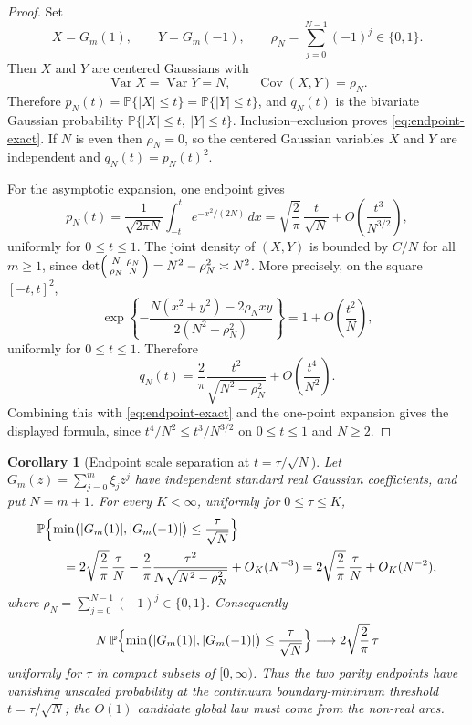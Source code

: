 \documentclass[11pt]{amsart}
\numberwithin{equation}{section}
\newtheorem{corollary}[theorem]{Corollary}
\theoremstyle{definition}
\theoremstyle{remark}
\newcommand{\Prob}{\mathbb P}
\newcommand{\Var}{\operatorname{Var}}
\newcommand{\Cov}{\operatorname{Cov}}
\begin{document}
\begin{proof}
Set
\[
  X=G_m(1),\qquad Y=G_m(-1),\qquad
  \rho_N=\sum_{j=0}^{N-1}(-1)^j\in\{0,1\}.
\]
Then \(X\) and \(Y\) are centered Gaussians with
\[
  \Var X=\Var Y=N,\qquad \Cov(X,Y)=\rho_N .
\]
Therefore \(p_N(t)=\Prob\{|X|\le t\}=\Prob\{|Y|\le t\}\), and \(q_N(t)\) is
the bivariate Gaussian probability
\(\Prob\{|X|\le t,\ |Y|\le t\}\). Inclusion--exclusion proves
\eqref{eq:endpoint-exact}.  If \(N\) is even then \(\rho_N=0\), so the centered
Gaussian variables \(X\) and \(Y\) are independent and \(q_N(t)=p_N(t)^2\).

For the asymptotic expansion, one endpoint gives
\[
  p_N(t)
  =\frac1{\sqrt{2\pi N}}\int_{-t}^{t}e^{-x^2/(2N)}\,dx
  =
  \sqrt{\frac2\pi}\,\frac{t}{\sqrt N}
  +O\!\left(\frac{t^3}{N^{3/2}}\right),
\]
uniformly for \(0\le t\le1\).  The joint density of \((X,Y)\) is bounded by
\(C/N\) for all \(m\ge1\), since
\(\det\begin{psmallmatrix}N&\rho_N\\ \rho_N&N\end{psmallmatrix}
=N^2-\rho_N^2\asymp N^2\).  More precisely, on the square
\([-t,t]^2\),
\[
  \exp\!\left\{
    -\frac{N(x^2+y^2)-2\rho_Nxy}{2(N^2-\rho_N^2)}
  \right\}
  =1+O\!\left(\frac{t^2}{N}\right),
\]
uniformly for \(0\le t\le1\).  Therefore
\[
  q_N(t)
  =\frac{2}{\pi}\frac{t^2}{\sqrt{N^2-\rho_N^2}}
  +O\!\left(\frac{t^4}{N^2}\right).
\]
Combining this with \eqref{eq:endpoint-exact} and the one-point expansion gives
the displayed formula, since \(t^4/N^2\le t^3/N^{3/2}\) on \(0\le t\le1\) and
\(N\ge2\).
\end{proof}

\begin{corollary}[Endpoint scale separation at \(t=\tau/\sqrt N\)]
\label{cor:endpoint-continuum-negligible}
Let \(G_m(z)=\sum_{j=0}^m\xi_jz^j\) have independent standard real Gaussian
coefficients, and put \(N=m+1\).  For every \(K<\infty\), uniformly for
\(0\le \tau\le K\),
\[
  \begin{aligned}
  &\Prob\Bigl\{
      \min\bigl(|G_m(1)|,|G_m(-1)|\bigr)\le \frac{\tau}{\sqrt N}
    \Bigr\}  \\
  &\qquad =
  2\sqrt{\frac2\pi}\,\frac{\tau}{N}
  -\frac{2}{\pi}\frac{\tau^2}{N\sqrt{N^2-\rho_N^2}}
  +O_K(N^{-3})
  =
  2\sqrt{\frac2\pi}\,\frac{\tau}{N}+O_K(N^{-2}),
  \end{aligned}
\]
where \(\rho_N=\sum_{j=0}^{N-1}(-1)^j\in\{0,1\}\).  Consequently
\[
  N\,\Prob\Bigl\{
      \min\bigl(|G_m(1)|,|G_m(-1)|\bigr)\le \frac{\tau}{\sqrt N}
    \Bigr\}
  \longrightarrow 2\sqrt{\frac2\pi}\,\tau
\]
uniformly for \(\tau\) in compact subsets of \([0,\infty)\).  Thus the two
parity endpoints have vanishing unscaled probability at the continuum
boundary-minimum threshold \(t=\tau/\sqrt N\); the \(O(1)\) candidate global
law must come from the non-real arcs.
\end{corollary}
\end{document}
